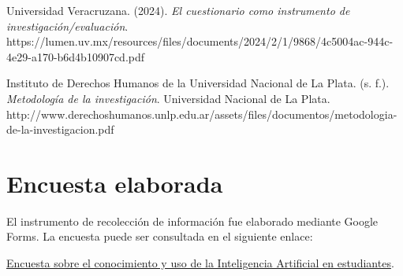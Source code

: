 \documentclass[12pt,letterpaper]{article}
\begin{document}
\hangindent=1.27cm

Universidad Veracruzana. (2024). 
\textit{El cuestionario como instrumento de investigación/evaluación}. 
https://lumen.uv.mx/resources/files/documents/2024/2/1/9868/4c5004ac-944c-4e29-a170-b6d4b10907cd.pdf

\hangindent=1.27cm

Instituto de Derechos Humanos de la Universidad Nacional de La Plata. (s. f.). 
\textit{Metodología de la investigación}. 
Universidad Nacional de La Plata. 
http://www.derechoshumanos.unlp.edu.ar/assets/files/documentos/metodologia-de-la-investigacion.pdf

\section*{Encuesta elaborada}

El instrumento de recolección de información fue elaborado mediante Google Forms.
La encuesta puede ser consultada en el siguiente enlace:

\href{https://docs.google.com/forms/d/e/1FAIpQLSdn-KN6MWQF3YVcPPS4IwZZOUlooedp1UIy0hJ0T31uJIjDgg/viewform?usp=publish-editor}
{Encuesta sobre el conocimiento y uso de la Inteligencia Artificial en estudiantes}.
\end{document}
